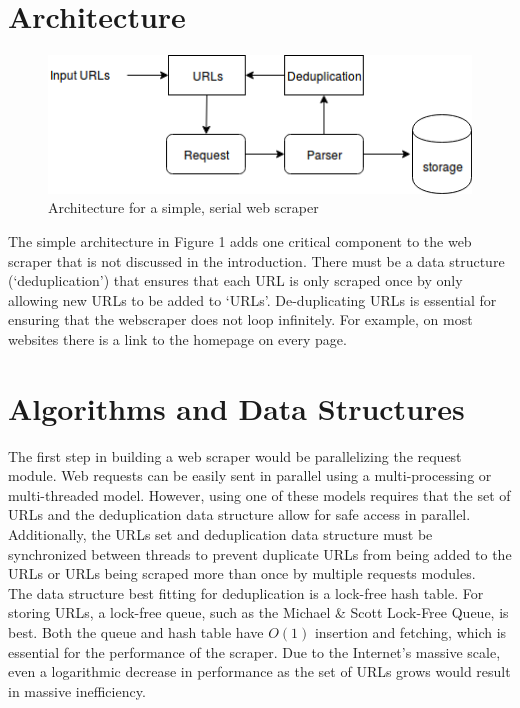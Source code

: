 \documentclass[11pt]{article}
\begin{document}
\section{Architecture}

\begin{figure}[H]
	\centering
	\includegraphics[scale=0.5]{simple_scraper}
	\caption{Architecture for a simple, serial web scraper}
\end{figure}

The simple architecture in Figure 1 adds one critical component to the web scraper that is not discussed in the introduction. There must be a data structure (`deduplication') that ensures that each URL is only scraped once by only allowing new URLs to be added to `URLs'. De-duplicating URLs is essential for ensuring that the webscraper does not loop infinitely. For example, on most websites there is a link to the homepage on every page.

\section{Algorithms and Data Structures}

The first step in building a web scraper would be parallelizing the request module. Web requests can be easily sent in parallel using a multi-processing or multi-threaded model. However, using one of these models requires that the set of URLs and the deduplication data structure allow for safe access in parallel. Additionally, the URLs set and deduplication data structure must be synchronized between threads to prevent duplicate URLs from being added to the URLs or URLs being scraped more than once by multiple requests modules. \\

The data structure best fitting for deduplication is a lock-free hash table. For storing URLs, a lock-free queue, such as the Michael \& Scott Lock-Free Queue, is best. Both the queue and hash table have $O(1)$ insertion and fetching, which is essential for the performance of the scraper. Due to the Internet's massive scale, even a logarithmic decrease in performance as the set of URLs grows would result in massive inefficiency. \\
\end{document}
